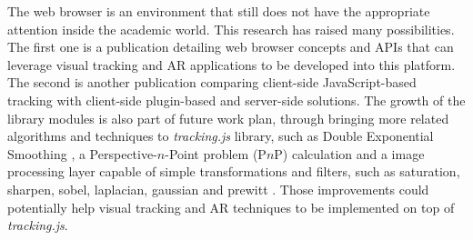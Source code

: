 The web browser is an environment that still does not have the appropriate attention inside the academic world. This research has raised many possibilities. The first one is a publication detailing web browser concepts and APIs that can leverage visual tracking and AR applications to be developed into this platform. The second is another publication comparing client-side JavaScript-based tracking with client-side plugin-based and server-side solutions. The growth of the library modules is also part of future work plan, through bringing more related algorithms and techniques to \textit{tracking.js} library, such as Double Exponential Smoothing \cite{LaViola2003}, a Perspective-$n$-Point problem (P$n$P) calculation and a image processing layer capable of simple transformations and filters, such as saturation, sharpen, sobel, laplacian, gaussian and prewitt \cite{Gonzalez2007}. Those improvements could potentially help visual tracking and AR techniques to be implemented on top of \textit{tracking.js}.


